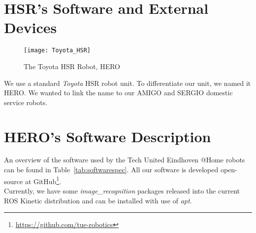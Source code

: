\section*{HSR's Software and External Devices}

\setlength\intextsep{0pt}
\begin{wrapfigure}[5]{r}{0.3\textwidth}
	\centering
	\texttt{[image: Toyota\_HSR]}
	\caption{The Toyota HSR Robot, HERO}
	\label{fig:hsr}
\end{wrapfigure}

We use a standard \textit{Toyota} HSR robot unit. To differentiate our unit, we named it HERO. We wanted to link the name to our AMIGO and SERGIO domestic service robots.

\section*{HERO's Software Description}

An overview of the software used by the Tech United Eindhoven @Home robots can be found in Table~\ref{tab:softwarespec}.
All our software is developed open-source at GitHub\footnote{\url{https://github.com/tue-robotics}}.
\\\newline
Currently, we have some \textit{image\_recognition} packages released into the current ROS Kinetic distribution and can be installed with use of \textit{apt}.

